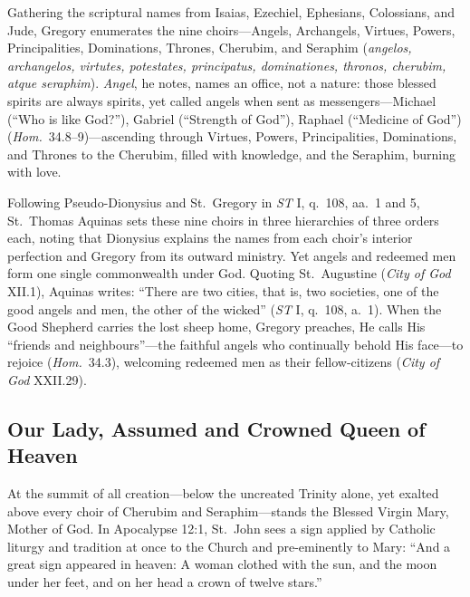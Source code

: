 Gathering the scriptural names from Isaias, Ezechiel, Ephesians, Colossians, and Jude, Gregory enumerates the nine choirs---Angels, Archangels, Virtues, Powers, Principalities, Dominations, Thrones, Cherubim, and Seraphim (\textit{angelos, archangelos, virtutes, potestates, principatus, dominationes, thronos, cherubim, atque seraphim}). \textit{Angel}, he notes, names an office, not a nature: those blessed spirits are always spirits, yet called angels when sent as messengers---Michael (``Who is like God?''), Gabriel (``Strength of God''), Raphael (``Medicine of God'') (\textit{Hom.}\ 34.8--9)---ascending through Virtues, Powers, Principalities, Dominations, and Thrones to the Cherubim, filled with knowledge, and the Seraphim, burning with love.

Following Pseudo-Dionysius and St.\ Gregory in \textit{ST} I, q.\ 108, aa.\ 1 and 5, St.\ Thomas Aquinas sets these nine choirs in three hierarchies of three orders each, noting that Dionysius explains the names from each choir's interior perfection and Gregory from its outward ministry. Yet angels and redeemed men form one single commonwealth under God. Quoting St.\ Augustine (\textit{City of God} XII.1), Aquinas writes: ``There are two cities, that is, two societies, one of the good angels and men, the other of the wicked'' (\textit{ST} I, q.\ 108, a.\ 1). When the Good Shepherd carries the lost sheep home, Gregory preaches, He calls His ``friends and neighbours''---the faithful angels who continually behold His face---to rejoice (\textit{Hom.}\ 34.3), welcoming redeemed men as their fellow-citizens (\textit{City of God} XXII.29).

\subsection*{Our Lady, Assumed and Crowned Queen of Heaven}

At the summit of all creation---below the uncreated Trinity alone, yet exalted above every choir of Cherubim and Seraphim---stands the Blessed Virgin Mary, Mother of God. In Apocalypse 12:1, St.\ John sees a sign applied by Catholic liturgy and tradition at once to the Church and pre-eminently to Mary: ``And a great sign appeared in heaven: A woman clothed with the sun, and the moon under her feet, and on her head a crown of twelve stars.''

